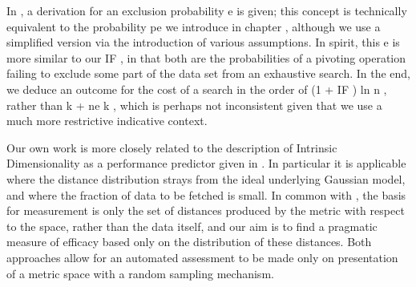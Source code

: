 In \cite{}, a derivation for an exclusion probability e is given; this concept is technically equivalent to the probability pe we introduce in chapter \label{}, although we use a simplified version via the introduction of various assumptions. In spirit, this e is more similar to our IF , in that both are the probabilities of a pivoting operation failing to exclude some part of the data set from an exhaustive search.
In the end, we deduce an outcome for the cost of a search in the order of (1 + IF ) ln n , rather than k + ne k , which is perhaps not inconsistent given that we use a much more restrictive indicative context.

Our own work is more closely related to the description of Intrinsic Dimensionality as a performance predictor given in \cite{}. In particular it is applicable where the distance distribution strays from the ideal underlying Gaussian model, and where the fraction of data to be fetched is small.
In common with \cite{}, the basis for measurement is only the set of distances produced by the metric with respect to the space, rather than the data itself, and our aim is to find a pragmatic measure of efficacy based only on the distribution of these distances. Both approaches allow for an automated assessment to be made only on presentation of a metric space with a random sampling mechanism.

